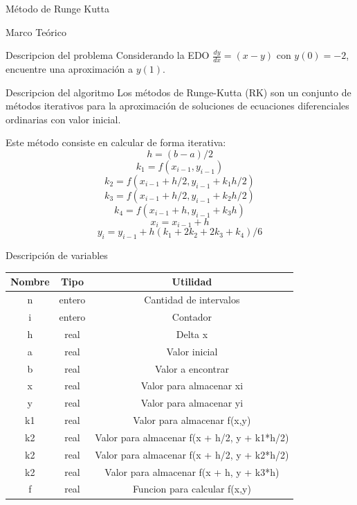 \documentclass[letterpaper, 12pt]{article}
\begin{document}
  \begin{section}{Método de Runge Kutta}
    \begin{subsection}{Marco Teórico}
      \begin{subsubsection}{Descripcion del problema}
        Considerando la EDO $\frac{dy}{dx} = (x -y)$ con $y(0)=-2$, encuentre una aproximación a $y(1)$.
      \end{subsubsection}
      \begin{subsubsection}{Descripcion del algoritmo}
        Los métodos de Runge-Kutta (RK) son un conjunto de métodos iterativos para la aproximación de soluciones de ecuaciones diferenciales ordinarias con valor inicial.

        Este método consiste en calcular de forma iterativa:
        \[h = (b - a)/2\]
        \[k_1 = f(x_{i-1}, y_{i-1})\]
        \[k_2 = f(x_{i-1} + h/2, y_{i-1} + k_1h/2)\]
        \[k_3 = f(x_{i-1} + h/2, y_{i-1} + k_2h/2)\]
        \[k_4 = f(x_{i-1} + h, y_{i-1} + k_3h)\]
        \[x_i = x_{i-1} + h\]
        \[y_i = y_{i-1} + h(k_1 + 2k_2 + 2k_3 + k_4)/6\]
      \end{subsubsection}
    \end{subsection}
    \begin{subsection}{Descripción de variables}
      \begin{table}[h]
        \centering
        \begin{tabular}{|c c c|}
          \hline
          Nombre & Tipo & Utilidad\\
          \hline\hline
          n & entero & Cantidad de intervalos \\
          i & entero & Contador \\
          h & real & Delta x \\
          a & real & Valor inicial \\
          b & real & Valor a encontrar \\
          x & real & Valor para almacenar xi \\
          y & real & Valor para almacenar yi\\
          k1 & real & Valor para almacenar f(x,y)\\
          k2 & real & Valor para almacenar f(x + h/2, y + k1*h/2)\\
          k2 & real & Valor para almacenar f(x + h/2, y + k2*h/2)\\
          k2 & real & Valor para almacenar f(x + h, y + k3*h)\\
          f & real & Funcion para calcular f(x,y) \\

\end{tabular}
\end{table}
\end{subsection}
\end{section}
\end{document}
